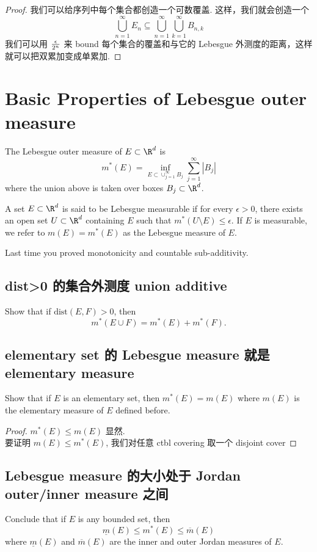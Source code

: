 \documentclass[lang=cn,11pt]{template}
\begin{document}
\begin{proof}
    我们可以给序列中每个集合都创造一个可数覆盖. 这样，我们就会创造一个 
    $$
    \bigcup_{n=1}^{\infty} E_n \subseteq \bigcup_{n=1}^{\infty} \bigcup_{k=1}^{\infty} B_{n,k}
    $$
    我们可以用 $\epsilon \over {2^n}$ 来 bound 每个集合的覆盖和与它的 Lebesgue 外测度的距离，这样就可以把双累加变成单累加.
\end{proof}


\newpage
\chapter{Basic Properties of Lebesgue outer measure}


  The Lebesgue outer measure of $E\subset \R^d$ is 
$$m^*(E)=\inf_{E\subset \cup_{j=1}^\infty B_j} \sum_{j=1}^\infty |B_j|
$$
where the union above is taken over boxes $B_j \subset \R^d$. 

 A set $E\subset \R^d$ is said to be Lebesgue measurable if for every $\epsilon>0$, there exists an open set $U\subset \R^d$ containing $E$ such that $m^*(U\setminus E)\leq \epsilon$. If $E$ is measurable, we refer to $m(E)=m^*(E)$ as the Lebesgue measure of $E$. 

Last time you proved monotonicity and countable sub-additivity.  

\section{dist>0 的集合外测度 union additive}
Show that if $\mathrm{dist}(E,F)>0$, then $$m^*(E\cup F)=m^*(E)+m^*(F).$$
 



\section{elementary set 的 Lebesgue measure 就是 elementary measure}
Show that if $E$ is an elementary set, then $m^*(E)=m(E)$ where $m(E)$ is the elementary measure of $E$ defined before.
\begin{proof}
    $m^*(E) \leq m(E)$ 显然. 
    \\要证明 $m(E) \leq m^*(E)$, 我们对任意 ctbl covering 取一个 disjoint cover   
\end{proof}





\section{Lebesgue measure 的大小处于 Jordan outer/inner measure 之间}
Conclude that if $E$ is any bounded set, then $$\underline m(E) \leq m^*(E) \leq \overline m (E)$$ where $\underline m(E)$ and $\overline m(E)$ are the inner and outer Jordan measures of $E$. 
\end{document}
